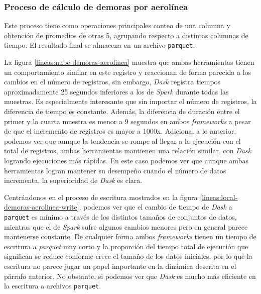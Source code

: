 \subsubsection{Proceso de cálculo de demoras por aerolínea}

Este proceso tiene como operaciones principales conteo de una columna y obtención de promedios de otras 5, agrupando respecto a distintas columnas de tiempo. El resultado final se almacena en un archivo \texttt{parquet}.

La figura \ref{lineas:nube-demoras-aerolinea} muestra que ambas herramientas tienen un comportamiento similar en este registro y reaccionan de forma parecida a los cambios en el número de registros, sin embargo, \textit{Dask} registra tiempos aproximadamente 25 segundos inferiores a los de \textit{Spark} durante todas las muestras. Es especialmente interesante que sin importar el número de registros, la diferencia de tiempo es constante. Además, la diferencia de duración entre el primer y la cuarta muestra es menor a 9 segundos en ambos \textit{frameworks} a pesar de que el incremento de registros es mayor a 1000x. Adicional a lo anterior, podemos ver que aunque la tendencia se rompe al llegar a la ejecución con el total de registros, ambas herramientas mantienen una relación similar, con \textit{Dask} logrando ejecuciones más rápidas. En este caso podemos ver que aunque ambas herramientas logran mantener su desempeño cuando el número de datos incrementa, la superioridad de \textit{Dask} es clara.

Centrándonos en el proceso de escritura mostrados en la figura \ref{lineas:local-demoras-aerolinea-write}, podemos ver que el cambio de tiempo de \textit{Dask} a \texttt{parquet} es mínimo a través de los distintos tamaños de conjuntos de datos, mientras que el de \textit{Spark} sufre algunos cambios menores pero en general parece mantenerse constante. De cualquier forma ambos \textit{frameworks} tienen un tiempo de escritura a \textit{parquet} muy corto y la proporción del tiempo total de ejecución que significan se reduce conforme crece el tamaño de los datos iniciales, por lo que la escritura no parece jugar un papel importante en la dinámica descrita en el párrafo anterior. No obstante, si podemos ver que \textit{Dask} es mucho más eficiente en la escritura a archivos \texttt{parquet}.


